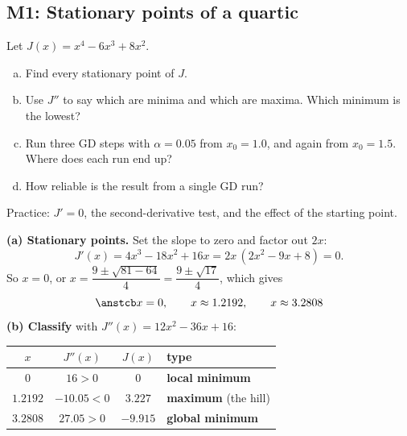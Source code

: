 \subsection{M1: Stationary points of a quartic}

\begin{frame}{}
  \begin{probbox}
    Let $J(x) = x^4 - 6x^3 + 8x^2$.
    \begin{enumerate}[(a)]
      \item Find every stationary point of $J$.
      \item Use $J''$ to say which are minima and which are maxima. Which minimum is the lowest?
      \item Run three GD steps with $\alpha = 0.05$ from $x_0 = 1.0$, and again from $x_0 = 1.5$.
            Where does each run end up?
      \item How reliable is the result from a single GD run?
    \end{enumerate}
  \end{probbox}
  \footnotesize\textcolor{mGrey}{Practice: $J' = 0$, the second-derivative test, and the effect of the starting point.}
\end{frame}

\begin{frame}{}
  \textbf{(a) Stationary points.} Set the slope to zero and factor out $2x$:
  \[
    J'(x) = 4x^3 - 18x^2 + 16x = 2x\,(2x^2 - 9x + 8) = 0 .
  \]
  So $x = 0$, or $x = \dfrac{9 \pm \sqrt{81 - 64}}{4} = \dfrac{9\pm\sqrt{17}}{4}$, which gives
  \[
    \ans{x = 0,\qquad x \approx 1.2192,\qquad x \approx 3.2808}
  \]
  \textbf{(b) Classify} with $J''(x) = 12x^2 - 36x + 16$:
  \begin{center}\small
  \begin{tabular}{@{}c c c l@{}}
    \toprule
    $x$ & $J''(x)$ & $J(x)$ & type \\
    \midrule
    $0$ & $16 > 0$ & $0$ & \textcolor{mTeal}{\textbf{local minimum}} \\
    $1.2192$ & $-10.05 < 0$ & $3.227$ & \textcolor{mOrange}{\textbf{maximum}} (the hill) \\
    $3.2808$ & $27.05 > 0$ & $-9.915$ & \textcolor{mTeal}{\textbf{global minimum}} \\
    \bottomrule
  \end{tabular}
  \end{center}
\end{frame}

